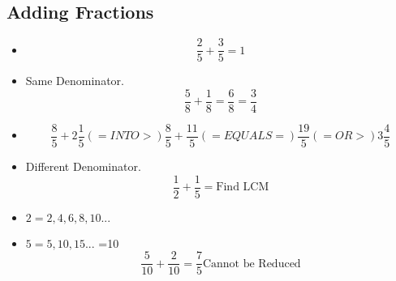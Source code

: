 \documentclass[]{article}
\begin{document}
\subsection{Adding Fractions}
\begin{itemize}
	\item \begin{equation}
	\frac {2}{5} + \frac{3}{5} = 1
	\end{equation}
	\item Same Denominator.
	\begin{equation}
		\frac{5}{8} + \frac{1}{8} = \frac{6}{8} = \frac{3}{4}
	\end{equation}
	\item 
	\begin{itemize}
		\begin{equation}
			\frac{8}{5} + 2 \frac{1}{5} (=INTO>)
			\frac{8}{5} + \frac{11}{5} (=EQUALS=) 
			\frac{19}{5}  (=OR>)  3 \frac{4}{5}
	\end{equation}
\end{itemize}
	\item Different Denominator.
	\begin{equation}
		\frac{1}{2} + \frac{1}{5} = \text{Find LCM}
	\end{equation}
	\item $2 = 2,4,6,8,10... $
	\item $5 = 5,10,15... $
			=10
	\begin{equation}
		\frac{5}{10} + \frac{2}{10} = \frac{7}{5}  \text{Cannot be Reduced}
	\end{equation}
\end{itemize}
\end{document}

